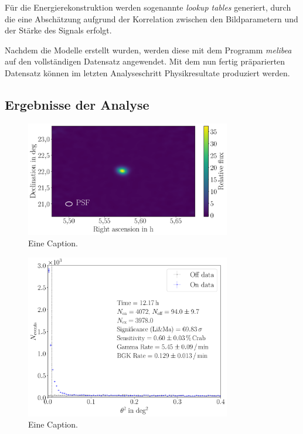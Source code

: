 Für die Energierekonstruktion werden sogenannte \textit{lookup tables}
generiert, durch die eine Abschätzung aufgrund der Korrelation zwischen den
Bildparametern und der Stärke des Signals erfolgt.

Nachdem die Modelle erstellt wurden, werden diese mit dem Programm
\textit{melibea} auf den vollständigen Datensatz angewendet. Mit dem nun fertig
präparierten Datensatz können im letzten Analyseschritt Physikresultate
produziert werden.

\subsection{Ergebnisse der Analyse}

\begin{figure}
  \centering
  \includegraphics[width=0.8\textwidth]{figures/caspar_flux_skymap.pdf}
  \caption{Eine Caption.}
\end{figure}

\begin{figure}
  \centering
  \includegraphics[width=0.8\textwidth]{figures/odie_thetasquared.pdf}
  \caption{Eine Caption.}
\end{figure}

